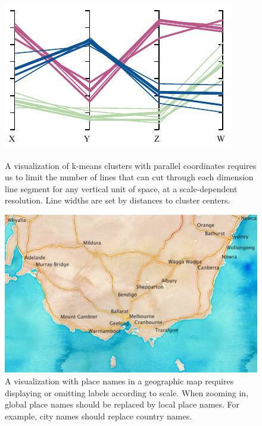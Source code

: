 \documentclass[11pt, oneside]{report}
\begin{document}
{\newpage

\begin{figure}[!t]
  \begin{minipage}{0.49\linewidth}
    \centerline{\includegraphics[width=0.973\linewidth]{figs-glossy/parallel_coordinates.pdf}}
    \caption{A visualization of k-means clusters with parallel coordinates requires us to limit the number of lines that can cut through each dimension line segment for any vertical unit of space, at a scale-dependent resolution. Line widths are set by distances to cluster centers.} \label{fig:example:clusters}
  \end{minipage} \hfill
  \begin{minipage}{0.49\linewidth}
    \centerline{\includegraphics[width=0.99\linewidth]{figs-glossy/placenames_viz.png}}
    \caption{A visualization with place names in a geographic map requires displaying or omitting labels according to scale. When zooming in, global place names should be replaced by local place names. For example, city names should replace country names.} \label{fig:example:placenames}
  \end{minipage}
\end{figure}



}
\end{document}
